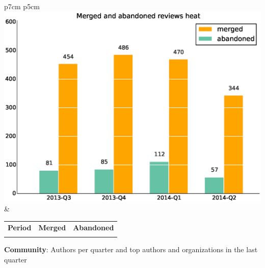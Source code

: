 \documentclass[a4wide,11pt]{report}
\begin{document}
\begin{tabular}{p{7cm} p{5cm}}
    \vspace{0pt} 
    \includegraphics[scale=.35]{figs/submitted_reviewsheat.eps}
    & 
    \vspace{0pt}
    \begin{tabular}{l|r|r|}%
    \bfseries Period & \bfseries Merged & \bfseries Abandoned %
    \csvreader[head to column names]{data/submitted_reviewsheat.csv}{}%
    {\\ & \merged & \abandoned}
    \end{tabular}
\end{tabular}


\textbf{Community}: Authors per quarter and top authors and organizations in the last quarter
\end{document}
